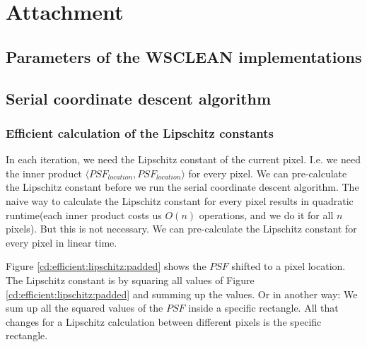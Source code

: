 \pagebreak
\section{Attachment}

\subsection*{Parameters of the WSCLEAN implementations}


\subsection*{Serial coordinate descent algorithm}

\subsubsection*{Efficient calculation of the Lipschitz constants}
In each iteration, we need the Lipschitz constant of the current pixel. I.e. we need the inner product $\langle PSF_{location}, PSF_{location} \rangle$ for every pixel. We can pre-calculate the Lipschitz constant before we run the serial coordinate descent algorithm. The naive way to calculate the Lipschitz constant for every pixel results in quadratic runtime(each inner product costs us $O(n)$ operations, and we do it for all $n$ pixels). But this is not necessary. We can pre-calculate the Lipschitz constant for every pixel in linear time.

Figure \ref{cd:efficient:lipschitz:padded} shows the $PSF$ shifted to a pixel location. The Lipschitz constant is by squaring all values of Figure \ref{cd:efficient:lipschitz:padded} and summing up the values. Or in another way: We sum up all the squared values of the $PSF$ inside a specific rectangle. All that changes for a Lipschitz calculation between different pixels is the specific rectangle.

